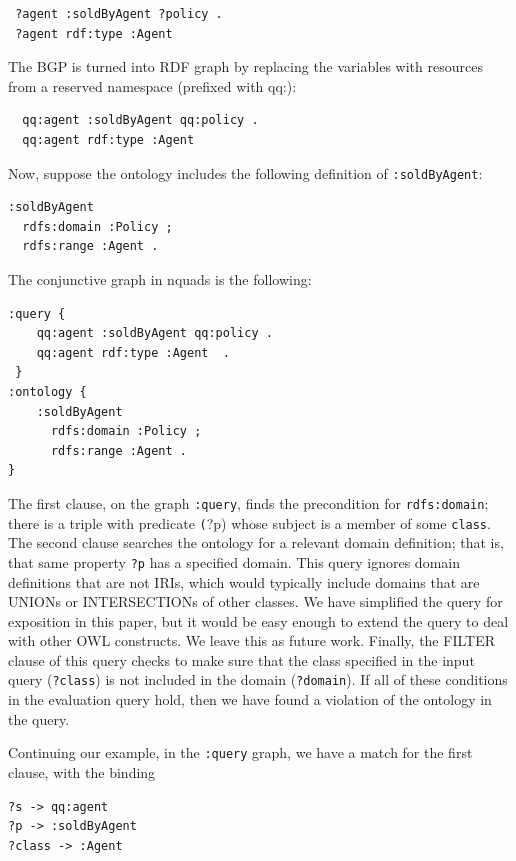 \documentclass[11pt]{article}
\begin{document}
\begin{verbatim}
 ?agent :soldByAgent ?policy . 
 ?agent rdf:type :Agent

\end{verbatim}

The BGP is turned into RDF graph by replacing the variables with resources from a reserved namespace (prefixed with qq:): 

\begin{verbatim}
  qq:agent :soldByAgent qq:policy . 
  qq:agent rdf:type :Agent
\end{verbatim}

Now, suppose the ontology includes the following definition of \texttt{:soldByAgent}: 

\begin{verbatim}
:soldByAgent 
  rdfs:domain :Policy ;
  rdfs:range :Agent .
\end{verbatim}

The conjunctive graph in nquads is the following: 

\begin{verbatim}
:query {
    qq:agent :soldByAgent qq:policy . 
    qq:agent rdf:type :Agent  .
 }
:ontology {
    :soldByAgent 
      rdfs:domain :Policy ;
      rdfs:range :Agent . 
}
\end{verbatim}


The first clause, on the graph \texttt{:query}, finds the precondition for \texttt{rdfs:domain}; there is a triple with predicate \texttt(?p) whose subject is a member of some \texttt{class}.
The second clause searches the ontology for a relevant domain definition; that is, that same property \texttt{?p} has a specified domain.  This query ignores domain definitions that are not IRIs, which would typically include domains that are UNIONs or INTERSECTIONs of other classes. We have simplified the query for exposition in this paper, but it would be easy enough to extend the query to deal with other OWL constructs. We leave this as future work.
Finally, the FILTER clause of this query checks to make sure that the class specified in the  input query (\texttt{?class}) is not included in the domain (\texttt{?domain}). 
If all of these conditions in the evaluation query hold, then we have found a violation of the ontology in the query.  

Continuing our example, in the \texttt{:query} graph, we have a match for the first clause, with the binding 

\begin{verbatim}
?s -> qq:agent
?p -> :soldByAgent
?class -> :Agent
\end{verbatim}
\end{document}

